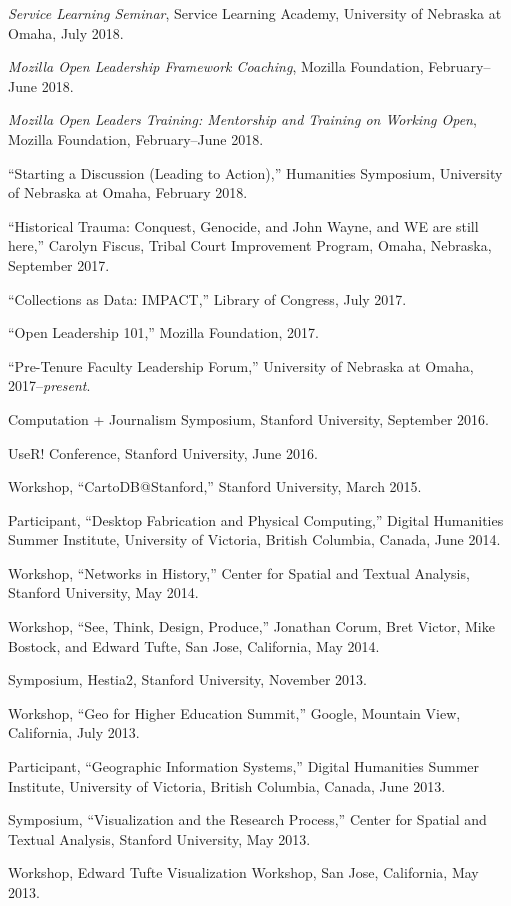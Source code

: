 \emph{Service Learning Seminar}, Service Learning Academy, University of
Nebraska at Omaha, July 2018.

\emph{Mozilla Open Leadership Framework Coaching}, Mozilla Foundation,
February--June 2018.

\emph{Mozilla Open Leaders Training: Mentorship and Training on Working
Open}, Mozilla Foundation, February--June 2018.

``Starting a Discussion (Leading to Action),'' Humanities Symposium,
University of Nebraska at Omaha, February 2018.

``Historical Trauma: Conquest, Genocide, and John Wayne, and WE are
still here,'' Carolyn Fiscus, Tribal Court Improvement Program, Omaha,
Nebraska, September 2017.

``Collections as Data: IMPACT,'' Library of Congress, July 2017.

``Open Leadership 101,'' Mozilla Foundation, 2017.

``Pre-Tenure Faculty Leadership Forum,'' University of Nebraska at
Omaha, 2017--\emph{present}.

Computation + Journalism Symposium, Stanford University, September 2016.

UseR! Conference, Stanford University, June 2016.

Workshop, ``CartoDB@Stanford,'' Stanford University, March 2015.

Participant, ``Desktop Fabrication and Physical Computing,'' Digital
Humanities Summer Institute, University of Victoria, British Columbia,
Canada, June 2014.

Workshop, ``Networks in History,'' Center for Spatial and Textual
Analysis, Stanford University, May 2014.

Workshop, ``See, Think, Design, Produce,'' Jonathan Corum, Bret Victor,
Mike Bostock, and Edward Tufte, San Jose, California, May 2014.

Symposium, Hestia2, Stanford University, November 2013.

Workshop, ``Geo for Higher Education Summit,'' Google, Mountain View,
California, July 2013.

Participant, ``Geographic Information Systems,'' Digital Humanities
Summer Institute, University of Victoria, British Columbia, Canada, June
2013.

Symposium, ``Visualization and the Research Process,'' Center for
Spatial and Textual Analysis, Stanford University, May 2013.

Workshop, Edward Tufte Visualization Workshop, San Jose, California, May
2013.

